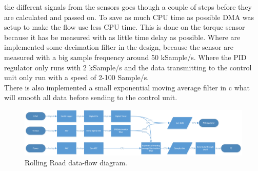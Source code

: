 the different signals from the sensors goes though a couple of steps before they are calculated and passed on. To save as much CPU time as possible DMA was setup to make the flow use less CPU time. This is done on the torque sensor because it has be measured with as little time delay as possible. Where are implemented some decimation filter in the design, because the sensor are measured with a big sample frequency around 50 kSample/s. Where the PID regulator only runs with 2 kSample/s and the data transmitting to the control unit only run with a speed of 2-100 Sample/s.\\
There is also implemented a small exponential moving average filter in c what will smooth all data before sending to the control unit.    
\begin{figure}[H]
	\centering
	\includegraphics [width=6in]{../Documentation_RR/Software/Pictures/data-flow.png}
	\caption{Rolling Road data-flow diagram.}
	\label{fig:data_flow_diagram}
\end{figure}
